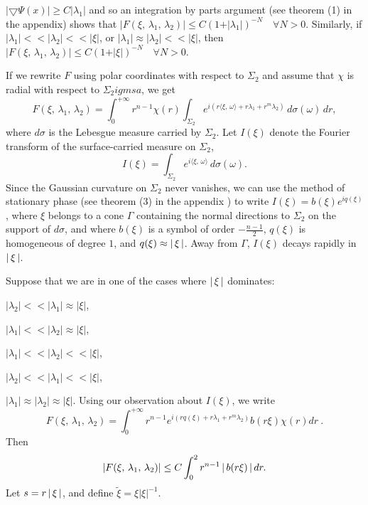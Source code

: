 $\vert{ \bigtriangledown\Psi(x)}\vert \ge C\vert{\lambda_1}\vert$ and so an integration by parts 
argument (see theorem (1) in the appendix) shows that
$\vert{F(\xi,\,\lambda_1,\,\lambda_2) }\vert\leq C(1+\vert{\lambda_1}\vert)^{-N} \quad \forall 
N>0 $.
Similarly, if $ \vert{\lambda_1}\vert<\!< \vert{\lambda_2}\vert<\!< \vert{\xi}\vert$, or
$ \vert{\lambda_1}\vert\approx \vert{\lambda_2}\vert<\!< \vert{\xi}\vert$, then 
$\vert{F(\xi,\,\lambda_1,\,\lambda_2) }\vert\leq C(1+\vert{\xi}\vert)^{-N} \quad \forall 
N>0 $.
\par
If we rewrite 
$F$ using polar coordinates with respect to $\Sigma_2$ and assume  that 
$\chi$ is radial with respect to $\Sigma_2igmsa$, we get 
$$
F(\xi,\,\lambda_1,\,\lambda_2) =
 \int_{0}^{+\infty}r^{n-1}\chi(r)
\int_{\Sigma_2}e^{i(r\langle \xi,\, \omega\rangle +r\lambda_1+r^m\lambda_2)}
\,d\sigma(\omega)\,dr,
$$
where $ d\sigma$ is the Lebesgue measure carried by $\Sigma_2$.
Let $I(\xi)$ denote the Fourier transform of the surface-carried measure on
$\Sigma_2$, 
$$
I(\xi) = \int_{\Sigma_2}
e^{i\langle \xi,\, \omega\rangle }
\,d\sigma(\omega) .
$$
Since the Gaussian curvature on $\Sigma_2$ never vanishes, we can use 
the method of stationary phase (see theorem (3) in the appendix ) 
to write 
$I(\xi)= b(\xi)e^{iq(\xi)}$,  where $\xi $ belongs to a cone $\Gamma$ containing 
the 
normal directions to $\Sigma_2$ on the support of $d\sigma$, and where 
$b(\xi) $ is a symbol of order 
$-\frac{n-1}{2}$, $q(\xi)$ is homogeneous of degree $1$, and 
$q(\xi)\approx\left\vert\,{\xi}\,\right\vert$.
Away from $\Gamma$, $I(\xi)$ decays rapidly in  $\left\vert\,{\xi}\,\right\vert$.
\par
Suppose that we are in one of the cases where $\left\vert\,{\xi}\,\right\vert$ dominates: 
\roster
\item $ \vert{\lambda_2}\vert<\!< \vert{\lambda_1}\vert\approx \vert\xi\vert$,
\item $ \vert{\lambda_1}\vert<\!< \vert{\lambda_2}\vert \approx\vert\xi\vert $,
\item $ \vert{\lambda_1}\vert<\!<\vert{\lambda_2}\vert <\!< \vert\xi\vert$,
\item $ \vert{\lambda_2}\vert<\!<\vert{\lambda_1}\vert <\!< \vert\xi\vert$,
\item $ \vert{\lambda_1}\vert\approx \vert{\lambda_2}\vert \approx\vert\xi\vert $.
\endroster
Using our observation about $I(\xi)$, we write 
$$
F(\xi,\,\lambda_1,\,\lambda_2) = 
 \int_{0}^{+\infty}r^{n-1}
e^{i( rq(\xi)+r\lambda_1+r^m\lambda_2)}b(r\xi)\chi(r)dr \ .
$$
Then
$$ 
\vert{F(\xi,\,\lambda_1,\,\lambda_2)}\vert\leq C\int_{0}^{2}
r^{n-1}\left\vert\,{b(r\xi)}\,\right\vert dr.
$$
Let $s=r\left\vert\,{\xi}\,\right\vert $, and define $ \tilde\xi =\xi\vert\xi\vert^{-1}$. 
